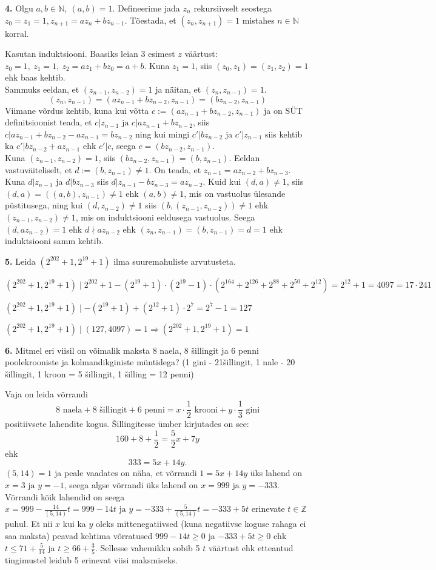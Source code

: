 \documentclass[a4paper, 10pt]{article}
\begin{document}
\noindent\textbf{4.} Olgu $a,b\in\mathbb{N},\ (a,b)=1$. Defineerime jada $z_n$ rekursiivselt seostega $z_0=z_1=1, z_{n+1}=az_n+bz_{n-1}$. Tõestada, et $(z_n,z_{n+1})=1$ mistahes $n\in\mathbb{N}$ korral.
\bigskip

Kasutan induktsiooni. Baasiks leian 3 esimest $z$ väärtust: $z_0=1,\ z_1=1,\ z_2=az_1+bz_0=a+b$. Kuna $z_1=1$, siis $(z_0,z_1)=(z_1,z_2)=1$ ehk baas kehtib.\\
Sammuks eeldan, et $(z_{n-1},z_{n-2})=1$ ja näitan, et $(z_n,z_{n-1})=1$. $$(z_n,z_{n-1})=(az_{n-1}+bz_{n-2},z_{n-1})=(bz_{n-2},z_{n-1})$$ Viimane võrdus kehtib, kuna kui võtta $c:=(az_{n-1}+bz_{n-2},z_{n-1})$ ja on SÜT definitsioonist teada, et $c|z_{n-1}\text{ ja }c|az_{n-1}+bz_{n-2}$, siis $c|az_{n-1}+bz_{n-2}-az_{n-1}=bz_{n-2}$ ning kui mingi $c'|bz_{n-2}$ ja $c'|z_{n-1}$ siis kehtib ka $c'|bz_{n-2}+az_{n-1}$ ehk $c'|c$, seega $c=(bz_{n-2},z_{n-1})$.\\
Kuna $(z_{n-1},z_{n-2})=1$, siis $(bz_{n-2},z_{n-1})=(b,z_{n-1})$. Eeldan vastuväiteliselt, et $d:=(b,z_{n-1})\neq1$. On teada, et $z_{n-1}=az_{n-2}+bz_{n-3}$. Kuna $d|z_{n-1}$ ja $d|bz_{n-3}$ siis $d|z_{n-1}-bz_{n-3}=az_{n-2}$. Kuid kui $(d,a)\neq1$, siis $(d,a)=((a,b),z_{n-1})\neq1$ ehk $(a,b)\neq1$, mis on vastuolus ülesande püstitusega, ning kui $(d,z_{n-2})\neq1$ siis $(b,(z_{n-1},z_{n-2}))\neq1$ ehk $(z_{n-1},z_{n-2})\neq1$, mis on induktsiooni eeldusega vastuolus. Seega $(d,az_{n-2})=1$ ehk $d\nmid az_{n-2}$ ehk $(z_n,z_{n-1})=(b,z_{n-1})=d=1$ ehk induktsiooni samm kehtib.
\bigskip

\pagebreak
\noindent \textbf{5.} Leida  $(2^{202}+1,2^{19}+1)$ ilma suuremahuliste arvutusteta. 

\bigskip
$(2^{202}+1,2^{19}+1)\mid 2^{202}+1-(2^{19}+1)\cdot(2^{19}-1)\cdot(2^{164}+2^{126}+2^{88}+2^{50}+2^{12})=2^{12}+1=4097=17\cdot 241$

$(2^{202}+1,2^{19}+1)\mid
-(2^{19}+1)+(2^{12}+1)\cdot2^7=2^7-1=127$

$(2^{202}+1,2^{19}+1)\mid(127,4097)=1\Rightarrow (2^{202}+1,2^{19}+1)=1$

\bigskip

\noindent\textbf{6.} Mitmel eri viisil on võimalik maksta 8 naela, 8 šillingit ja 6 penni poolekrooniste ja kolmandikginiste müntidega? (1 gini - 21šillingit, 1 nale - 20 šillingit, 1 kroon = 5 šillingit, 1 šilling = 12 penni)

\bigskip
Vaja on leida võrrandi $$8\text{ naela} + 8\text{ šillingit}+6\text{ penni}=x\cdot\frac12\text{ krooni}+y\cdot\frac13\text{ gini}$$ positiivsete lahendite kogus. Šillingitesse ümber kirjutades on see: $$160+8+\frac12=\frac52x+7y$$ ehk $$333=5x+14y.$$ $(5,14)=1$ ja peale vaadates on näha, et võrrandi $1=5x+14y$ üks lahend on $x=3\text{ ja }y=-1$, seega algse võrrandi üks lahend on $x=999\text{ ja }y=-333$. Võrrandi kõik lahendid on seega $x=999-\frac{14}{(5,14)}t=999-14t\text{ ja }y=-333+\frac{5}{(5,14)}t=-333+5t$ erinevate $t\in\mathbb{Z}$ puhul. Et nii $x$ kui ka $y$ oleks mittenegatiivsed (kuna negatiivse koguse rahaga ei saa maksta) peavad kehtima võrratused $999-14t\geq0$ ja $-333+5t\geq0$ ehk $t\leq71+\frac5{14}$ ja $t\geq 66+\frac35$. Sellesse vahemikku sobib 5 $t$ väärtust ehk etteantud tingimustel leidub 5 erinevat viisi maksmiseks.
\bigskip
\end{document}
